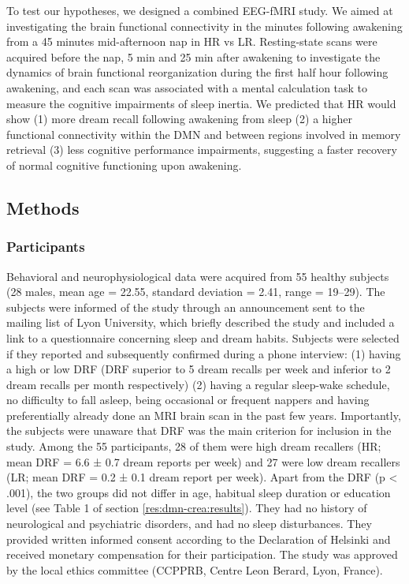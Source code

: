 To test our hypotheses, we designed a combined EEG-fMRI study. We aimed at investigating the brain functional connectivity in the minutes following awakening from a 45 minutes mid-afternoon nap in HR vs LR. Resting-state scans were acquired before the nap, 5 min and 25 min after awakening to investigate the dynamics of brain functional reorganization during the first half hour following awakening, and each scan was associated with a mental calculation task to measure the cognitive impairments of sleep inertia. We predicted that HR would show (1) more dream recall following awakening from sleep (2) a higher functional connectivity within the DMN and between regions involved in memory retrieval (3) less cognitive performance impairments, suggesting a faster recovery of normal cognitive functioning upon awakening.

\subsection*{Methods}
\label{res:inertia:drf:methods}

\subsubsection*{Participants}
Behavioral and neurophysiological data were acquired from 55 healthy subjects (28 males, mean age = 22.55, standard deviation = 2.41, range = 19–29). The subjects were informed of the study through an announcement sent to the mailing list of Lyon University, which briefly described the study and included a link to a questionnaire concerning sleep and dream habits. Subjects were selected if they reported and subsequently confirmed during a phone interview: (1) having a high or low DRF (DRF superior to 5 dream recalls per week and inferior to 2 dream recalls per month respectively) (2) having a regular sleep-wake schedule, no difficulty to fall asleep, being occasional or frequent nappers and having preferentially already done an MRI brain scan in the past few years. Importantly, the subjects were unaware that DRF was the main criterion for inclusion in the study. Among the 55 participants, 28 of them were high dream recallers (HR; mean DRF = 6.6 ± 0.7 dream reports per week) and 27 were low dream recallers (LR; mean DRF = 0.2 ± 0.1 dream report per week). Apart from the DRF (p < .001), the two groups did not differ in age, habitual sleep duration or education level (see Table 1 of section \ref{res:dmn-crea:results}). They had no history of neurological and psychiatric disorders, and had no sleep disturbances. They provided written informed consent according to the Declaration of Helsinki and received monetary compensation for their participation. The study was approved by the local ethics committee (CCPPRB, Centre Leon Berard, Lyon, France).

